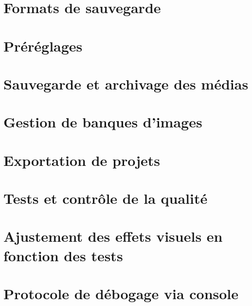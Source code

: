 \documentclass[
]{book}
\begin{document}
\hypertarget{formats-de-sauvegarde}{%
\section{Formats de sauvegarde}\label{formats-de-sauvegarde}}

\hypertarget{pruxe9ruxe9glages}{%
\section{Préréglages}\label{pruxe9ruxe9glages}}

\hypertarget{sauvegarde-et-archivage-des-muxe9dias}{%
\section{Sauvegarde et archivage des médias}\label{sauvegarde-et-archivage-des-muxe9dias}}

\hypertarget{gestion-de-banques-dimages}{%
\section{Gestion de banques d'images}\label{gestion-de-banques-dimages}}

\hypertarget{exportation-de-projets}{%
\section{Exportation de projets}\label{exportation-de-projets}}

\hypertarget{tests-et-contruxf4le-de-la-qualituxe9}{%
\section{Tests et contrôle de la qualité}\label{tests-et-contruxf4le-de-la-qualituxe9}}

\hypertarget{ajustement-des-effets-visuels-en-fonction-des-tests}{%
\section{Ajustement des effets visuels en fonction des tests}\label{ajustement-des-effets-visuels-en-fonction-des-tests}}

\hypertarget{protocole-de-duxe9bogage-via-console}{%
\section{Protocole de débogage via console}\label{protocole-de-duxe9bogage-via-console}}
\end{document}
